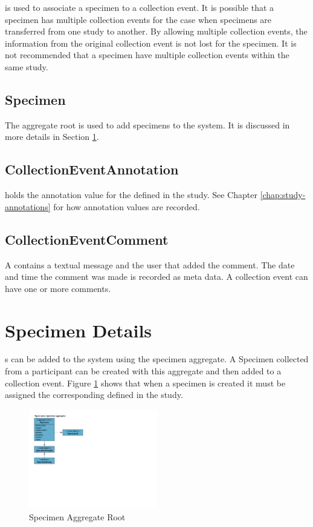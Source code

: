  is used to associate a specimen to a
collection event. It is possible that a specimen has multiple collection events
for the case when specimens are transferred from one study to another. By
allowing multiple collection events, the information from the original
collection event is not lost for the specimen. It is not recommended that a
specimen have multiple collection events within the same study.

\subsection*{Specimen}
The  aggregate root is used to add specimens to the
system. It is discussed in more details in Section
\ref{sec:specimen-aggregate}.

\subsection*{CollectionEventAnnotation}
 holds the annotation value for the
 defined in the study. See
Chapter \ref{chap:study-annotations} for how annotation values are recorded.

\subsection*{CollectionEventComment}
A  contains a textual message and the user
that added the comment. The date and time the comment was made is recorded as
meta data. A collection event can have one or more comments.

\section{Specimen Details}
\label{sec:specimen-aggregate}
s can be added to the system using the specimen
aggregate. A Specimen collected from a participant can be created with this
aggregate and then added to a collection event. Figure
\ref{fig:specimen-aggregate} shows that when a specimen is created it must be
assigned the corresponding  defined in the study.

\begin{figure}[H]
  \centering
  \includegraphics[trim={10mm 96mm 158mm 18mm}, clip,
    width=0.5\textwidth]{images/specimen-aggregate}
  \caption{Specimen Aggregate Root}
  \label{fig:specimen-aggregate}
\end{figure}


